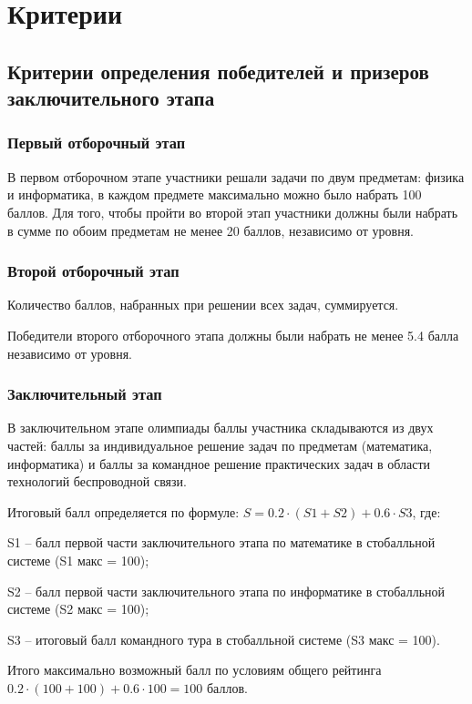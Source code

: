 \part{Критерии}

\chapter{Критерии определения победителей и призеров заключительного этапа}

\section{Первый отборочный этап}

В первом отборочном этапе участники решали задачи по двум предметам: физика и информатика, в каждом предмете максимально можно было набрать 100 баллов. Для того, чтобы пройти во второй этап участники  должны были набрать в сумме по обоим предметам не менее 20 баллов, независимо от уровня.

\section{Второй отборочный этап}

Количество баллов, набранных при решении всех задач, суммируется. 

Победители второго отборочного этапа должны были набрать не менее 5.4 балла независимо от уровня.

\section{Заключительный этап}

В заключительном этапе олимпиады баллы участника складываются из двух частей: баллы за индивидуальное решение задач по предметам (математика, информатика) и баллы за командное решение практических задач в области технологий беспроводной связи.

Итоговый балл определяется по формуле: $S = 0.2 \cdot  (S1+S2) + 0.6 \cdot S3$, где:

S1 – балл первой части заключительного этапа по математике в стобалльной системе (S1 макс = 100);

S2 – балл первой части заключительного этапа по информатике в стобалльной системе (S2 макс = 100);

S3 – итоговый балл командного тура в стобалльной системе (S3 макс = 100).

Итого максимально возможный балл по условиям общего рейтинга $0.2 \cdot (100+100) + 0.6 \cdot 100 = 100$ баллов.

